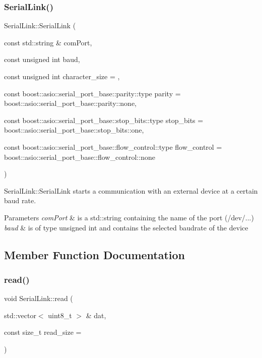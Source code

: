 \subsubsection{\texorpdfstring{SerialLink()}{SerialLink()}}
{\footnotesize\ttfamily Serial\+Link\+::\+Serial\+Link (\begin{DoxyParamCaption}\item[{const std\+::string \&}]{com\+Port,  }\item[{const unsigned int}]{baud,  }\item[{const unsigned int}]{character\+\_\+size = {},  }\item[{const boost\+::asio\+::serial\+\_\+port\+\_\+base\+::parity\+::type}]{parity = {\ttfamily boost\+:\+:asio\+:\+:serial\+\_\+port\+\_\+base\+:\+:parity\+:\+:none},  }\item[{const boost\+::asio\+::serial\+\_\+port\+\_\+base\+::stop\+\_\+bits\+::type}]{stop\+\_\+bits = {\ttfamily boost\+:\+:asio\+:\+:serial\+\_\+port\+\_\+base\+:\+:stop\+\_\+bits\+:\+:one},  }\item[{const boost\+::asio\+::serial\+\_\+port\+\_\+base\+::flow\+\_\+control\+::type}]{flow\+\_\+control = {\ttfamily boost\+:\+:asio\+:\+:serial\+\_\+port\+\_\+base\+:\+:flow\+\_\+control\+:\+:none} }\end{DoxyParamCaption})}



Serial\+Link\+::\+Serial\+Link starts a communication with an external device at a certain baud rate. 


\begin{DoxyParams}{Parameters}
{\em com\+Port} & is a std\+::string containing the \textquotesingle{}name\textquotesingle{} of the port (\textquotesingle{}/dev/...\textquotesingle{}) \\
\hline
{\em baud} & is of type unsigned int and contains the selected baudrate of the device \\
\hline
\end{DoxyParams}


\subsection{Member Function Documentation}
\mbox{\label{class_serial_link_a2f83d397031c69640346fd69a44364d0}} 
\subsubsection{\texorpdfstring{read()}{read()}}
{\footnotesize\ttfamily void Serial\+Link\+::read (\begin{DoxyParamCaption}\item[{std\+::vector$<$ uint8\+\_\+t $>$ \&}]{dat,  }\item[{const size\+\_\+t}]{read\+\_\+size = {} }\end{DoxyParamCaption})}



